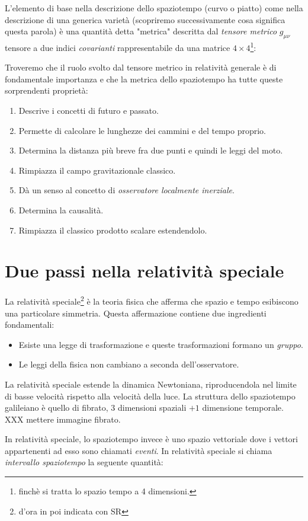\documentclass[twoside]{article}
\begin{document}
L'elemento di base nella descrizione dello spaziotempo (curvo o piatto) come nella descrizione di una generica varietà (scopriremo successivamente cosa significa questa parola) è una quantità detta "metrica" descritta dal \emph{tensore metrico} $g_{\mu \nu}$ tensore a due indici \emph{covarianti} rappresentabile da una matrice $4\times 4$\footnote{finchè si tratta lo spazio tempo a 4 dimensioni.}:

Troveremo che il ruolo svolto dal tensore metrico in relatività generale è di fondamentale importanza e che la metrica dello spaziotempo ha tutte queste sorprendenti proprietà:
\begin{enumerate}
	\item Descrive i concetti di futuro e passato.
	\item Permette di calcolare le lunghezze dei cammini e del tempo proprio.
	\item Determina la distanza più breve fra due punti e quindi le leggi del moto.
	\item Rimpiazza il campo gravitazionale classico.
	\item Dà un senso al concetto di \emph{osservatore localmente inerziale}.
	\item Determina la causalità.
	\item Rimpiazza il classico prodotto scalare estendendolo.
\end{enumerate}
\newpage
\section{Due passi nella relatività speciale}
La relatività speciale\footnote{d'ora in poi indicata con SR} è la teoria fisica che afferma che spazio e tempo esibiscono una particolare simmetria. Questa affermazione contiene due ingredienti fondamentali:
\begin{itemize}
 \item Esiste una legge di trasformazione e queste trasformazioni formano un \emph{gruppo}.
 \item Le leggi della fisica non cambiano a seconda dell'osservatore.
\end{itemize}

La relatività speciale estende la dinamica Newtoniana, riproducendola nel limite di basse velocità rispetto alla velocità della luce.
La struttura dello spaziotempo galileiano è quello di fibrato, $3$ dimensioni spaziali $+1$ dimensione temporale.
XXX mettere immagine fibrato.

In relatività speciale, lo spaziotempo invece è uno spazio vettoriale dove i vettori appartenenti ad esso sono chiamati \emph{eventi}. In relatività speciale si chiama \emph{intervallo spaziotempo} la seguente quantità:
\end{document}
